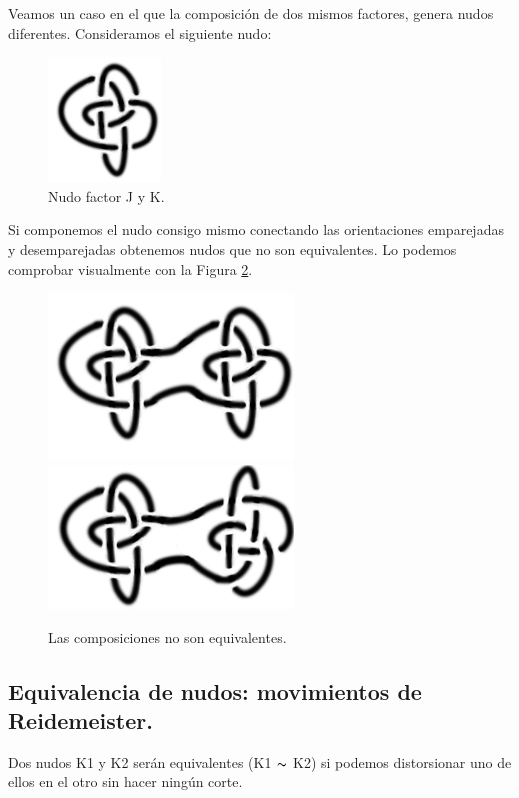 \documentclass[14pt]{extarticle}
\begin{document}
   Veamos un caso en el que la composición de dos mismos factores, genera nudos diferentes. Consideramos el siguiente nudo:\\
   
         \begin{figure}[h!]
         	\includegraphics[width=3cm]{inudos/817con.png}
         	\centering
         	\caption{Nudo factor J y K.}
         	\label{comp7} 
         \end{figure}
   Si componemos el nudo consigo mismo conectando las orientaciones emparejadas y desemparejadas obtenemos nudos que no son equivalentes. Lo podemos comprobar visualmente con la Figura \ref{comp8}.
   
         \begin{figure}[h!]
         	\includegraphics[width=6.5cm]{inudos/817def1.png}
         	\includegraphics[width=6.5cm]{inudos/817def2.png}
         	\centering
         	\caption{Las composiciones no son equivalentes.}
         	\label{comp8} 
         \end{figure}
 
    
   
\subsection{Equivalencia de nudos: movimientos de Reidemeister.}\label{seccion4}
Dos nudos K1 y K2 serán equivalentes (K1 $\thicksim$ K2) si podemos distorsionar uno de ellos en el otro sin hacer ningún corte. \\
\end{document}
